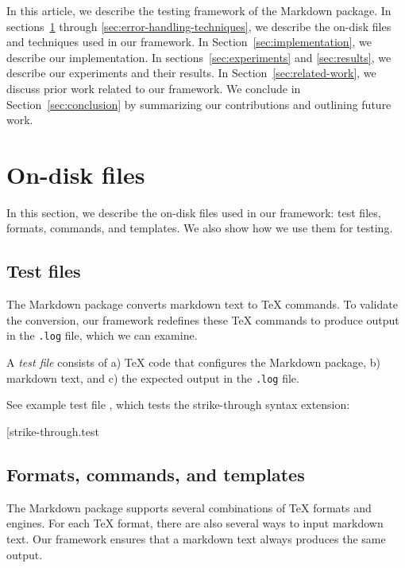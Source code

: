 \documentclass[final]{ltugboat}
\begin{document}
In this article, we describe the testing framework of the Markdown package. In sections~\ref{sec:on-disk-files} through \ref{sec:error-handling-techniques}, we describe the on-disk files and techniques used in our framework. In Section~\ref{sec:implementation}, we describe our implementation. In sections~\ref{sec:experiments} and \ref{sec:results}, we describe our experiments and their results. In Section~\ref{sec:related-work}, we discuss prior work related to our framework. We conclude in Section~\ref{sec:conclusion} by summarizing our contributions and outlining future work.

\section{On-disk files}
\label{sec:on-disk-files}

In this section, we describe the on-disk files used in our framework: test files, formats, commands, and templates. We also show how we use them for testing.

\subsection{Test files}
\label{sec:test-files}

The Markdown package converts markdown text to \TeX{} commands. To validate the conversion, our framework redefines these \TeX{} commands to produce output in the \texttt{.log} file, which we can examine.

A \emph{test file} consists of a) \TeX{} code that configures the Markdown package, b) markdown text, and c) the expected output in the \texttt{.log} file.

See example test file , which tests the strike-through syntax extension:

\smallskip
\noindent
\example*[{strike-through.test}

\subsection{Formats, commands, and templates}
\label{sec:formats-commands-and-templates}

The Markdown package supports several combinations of \TeX{} formats and engines. For each \TeX{} format, there are also several ways to input markdown text. Our framework ensures that a markdown text always produces the same output.
\end{document}
